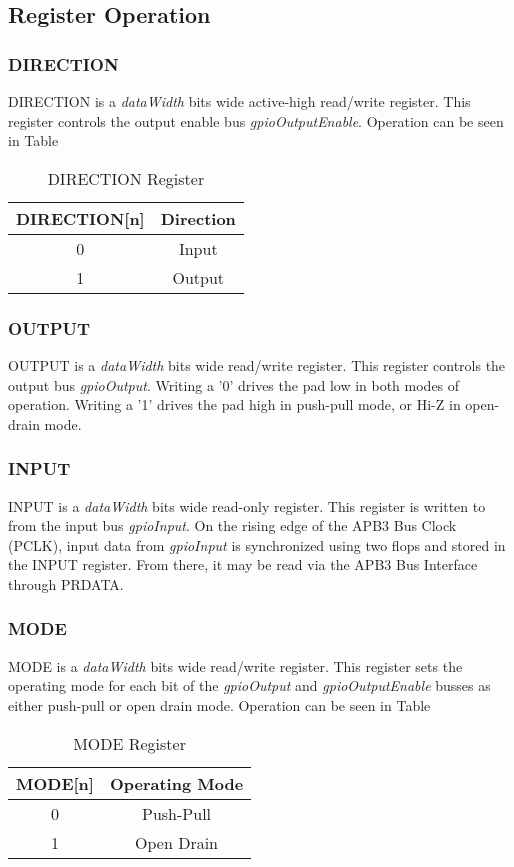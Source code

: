   \newpage

  \subsection{Register Operation}
  \subsubsection{DIRECTION}
  DIRECTION is a \textit{dataWidth} bits wide active-high read/write register. This register controls the 
  output enable bus \textit{gpioOutputEnable}. Operation can be seen in Table
  \begin{table}[h]
    \centering
    \begin{tabular}{|c|c|}
        \hline
        \textbf{DIRECTION[n]} & \textbf{Direction} \\ \hline
        0 & Input \\ \hline
        1 & Output \\ \hline
    \end{tabular}
    \caption{DIRECTION Register}
\end{table}

\subsubsection{OUTPUT}
OUTPUT is a \textit{dataWidth} bits wide read/write register. This register controls the 
output bus \textit{gpioOutput}. Writing a '0' drives the pad low in both modes of operation. Writing a '1' 
drives the pad high in push-pull mode, or Hi-Z in open-drain mode. 

\subsubsection{INPUT}
INPUT is a \textit{dataWidth} bits wide read-only register. This register is written to from the 
input bus \textit{gpioInput}. On the rising edge of the APB3 Bus Clock (PCLK), input data from \textit{gpioInput} 
is synchronized using two flops and stored in the INPUT register. From there, it may be read via the APB3 Bus Interface
through PRDATA. 

\subsubsection{MODE}
MODE is a \textit{dataWidth} bits wide read/write register. This register sets the operating mode for each bit
of the \textit{gpioOutput} and \textit{gpioOutputEnable} busses as either push-pull or open drain mode. Operation can be seen in Table
\begin{table}[h]
  \centering
  \begin{tabular}{|c|c|}
      \hline
      \textbf{MODE[n]} & \textbf{Operating Mode} \\ \hline
      0 & Push-Pull \\ \hline
      1 & Open Drain\\ \hline
  \end{tabular}
  \caption{MODE Register}
\end{table}

